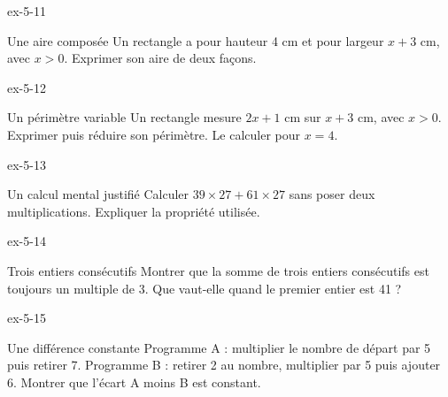 \begin{blocLivre}{ex-5-11}\begin{exercice}[3]{Une aire composée}
Un rectangle a pour hauteur 4 cm et pour largeur $x+3$ cm, avec $x>0$. Exprimer son aire de deux façons.
\label{fig-ex-5-11}
\end{exercice}\end{blocLivre}
\begin{blocLivre}{ex-5-12}\begin{exercice}[3]{Un périmètre variable}
Un rectangle mesure $2x+1$ cm sur $x+3$ cm, avec $x>0$. Exprimer puis réduire son périmètre. Le calculer pour $x=4$.
\label{fig-ex-5-12}
\end{exercice}\end{blocLivre}
\begin{blocLivre}{ex-5-13}\begin{exercice}[3]{Un calcul mental justifié}
Calculer $39\times27+61\times27$ sans poser deux multiplications. Expliquer la propriété utilisée.
\end{exercice}\end{blocLivre}
\begin{blocLivre}{ex-5-14}\begin{exercice}[3]{Trois entiers consécutifs}
Montrer que la somme de trois entiers consécutifs est toujours un multiple de 3. Que vaut-elle quand le premier entier est 41 ?
\end{exercice}\end{blocLivre}
\begin{blocLivre}{ex-5-15}\begin{exercice}[3]{Une différence constante}
Programme A : multiplier le nombre de départ par 5 puis retirer 7. Programme B : retirer 2 au nombre, multiplier par 5 puis ajouter 6. Montrer que l’écart A moins B est constant.
\end{exercice}\end{blocLivre}

\clearpage
